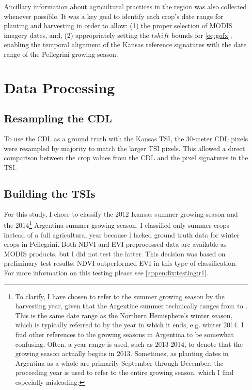 Ancillary information about agricultural practices in the region was also collected whenever possible. It was a key goal to identify each crop's date range for planting and harvesting in order to allow: (1) the proper selection of MODIS imagery dates, and, (2) appropriately setting the $tshift$ bounds for \autoref{eq:gofx}, enabling the temporal alignment of the Kansas reference signatures with the date range of the Pellegrini growing season.

\section{Data Processing}

\subsection{Resampling the CDL}

To use the CDL as a ground truth with the Kansas TSI, the 30-meter CDL pixels were resampled by majority to match the larger TSI pixels. This allowed a direct comparison between the crop values from the CDL and the pixel signatures in the TSI.

\subsection{Building the TSIs}
\label{buildingTSIs}

For this study, I chose to classify the 2012 Kansas summer growing season and the 2014\footnote{To clarify, I have chosen to refer to the summer growing season by the harvesting year, given that the Argentine summer technically ranges from  to . This is the same date range as the Northern Hemisphere's winter season, which is typically referred to by the year in which it ends, e.g. winter 2014. I find other references to the growing seasons in Argentina to be somewhat confusing. Often, a year range is used, such as 2013-2014, to denote that the growing season actually begins in 2013. Sometimes, as planting dates in Argentina as a whole are primarily September through December, the proceeding year is used to refer to the entire growing season, which I find especially misleading.} Argentina summer growing season. I classified only summer crops instead of a full agricultural year because I lacked ground truth data for winter crops in Pellegrini.  Both NDVI and EVI preprocessed data are available as MODIS products, but I did not test the latter. This decision was based on preliminary test results: NDVI outperformed EVI in this type of classification. For more information on this testing please see \autoref{appendix:testing:r1}.

